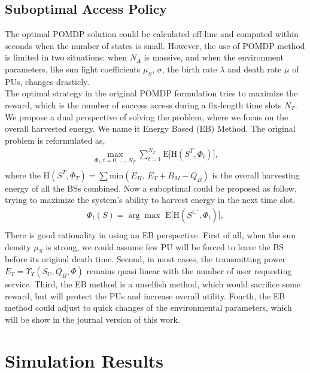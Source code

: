 \documentclass[conference]{IEEEtran}
\begin{document}
\subsection{Suboptimal Access Policy}
The optimal POMDP solution could be calculated off-line and 
computed within seconds when the number of states is small. 
However, the use of POMDP method is limited in two situations: when \(N_A\) is massive, 
and when the environment parameters, like sun light coefficients \(\mu_S\), \(\sigma\), 
the birth rate \(\lambda\) and death rate \(\mu\) of PUs, changes drasticly.\\
The optimal strategy in the original POMDP formulation tries to maximize the reward, 
which is the number of success access during a fix-length time slots \(N_T\).
We propose a dual perspective of solving the problem, where we focus on the overall harvested energy.
We name it Energy Based (EB) Method.
The original problem is reformulated as,
\begin{equation}
\begin{aligned}
	\underset{\Phi_t,t=0,\,...,\,N_T}{\max}\sum\limits_{t=1}^{N_T}\mbox{E}\lbrack\mbox{H}\left(S^T, \Phi_t\right)\rbrack,\\
\end{aligned}
\end{equation}
where the \(\mbox{H}\left(S^T, \Phi_T\right) = \sum\mbox{min}\left(E_H,\,E_T+B_M-Q_B\right)\)
is the overall harvesting energy of all the BSs combined.
Now a suboptimal could be proposed as follow,
trying to maximize the system's ability to harvest energy in the next time slot.
\begin{equation}
\begin{aligned}
	\Phi_t\left(S\right) = \arg{\max}\,\,\mbox{E}\lbrack\mbox{H}\left(S^{t,'}, \Phi_t\right)\rbrack,\\
\end{aligned}
\end{equation}
There is good rationality in using an EB perspective.
First of all, when the sun density \(\mu_S\) is strong, 
we could assume few PU will be forced to leave the BS before its original death time.
Second, in most cases, the transmitting power \(E_T = \Upsilon_T(S_U, Q_B, \Phi)\) 
remains quasi linear with the number of user requesting service.
Third, the EB method is a unselfish method, which would sacrifice some reward, 
but will protect the PUs and increase overall utility.
Fourth, the EB method could adjust to quick changes of the environmental parameters, 
which will be show in the journal version of this work.
\section{Simulation Results}


\end{document}
